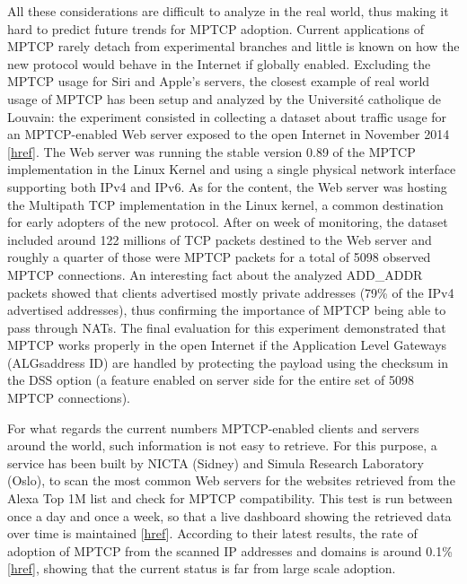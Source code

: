 All these considerations are difficult to analyze in the real world, thus making it hard to predict future trends for MPTCP adoption. Current applications of MPTCP rarely detach from experimental branches and little is known on how the new protocol would behave in the Internet if globally enabled. Excluding the MPTCP usage for Siri and Apple's servers, the closest example of real world usage of MPTCP has been setup and analyzed by the Université catholique de Louvain: the experiment consisted in collecting a dataset about traffic usage for an MPTCP-enabled Web server exposed to the open Internet in November 2014 [\href{http://inl.info.ucl.ac.be/system/files/paper_8.pdf}{href}]. The Web server was running the stable version 0.89 of the MPTCP implementation in the Linux Kernel and using a single physical network interface supporting both IPv4 and IPv6. As for the content, the Web server was hosting the Multipath TCP implementation in the Linux kernel, a common destination for early adopters of the new protocol. After on week of monitoring, the dataset included around 122 millions of TCP packets destined to the Web server and roughly a quarter of those were MPTCP packets for a total of 5098 observed MPTCP connections. 
An interesting fact about the analyzed ADD\_ADDR packets showed that clients advertised mostly private addresses (79\% of the IPv4 advertised addresses), thus confirming the importance of MPTCP being able to pass through NATs. 
The final evaluation for this experiment demonstrated that MPTCP works properly in the open Internet if the Application Level Gateways (ALGsaddress ID) are handled by protecting the payload using the checksum in the DSS option (a feature enabled on server side for the entire set of 5098 MPTCP connections).

For what regards the current numbers MPTCP-enabled clients and servers around the world, such information is not easy to retrieve. For this purpose, a service has been built by NICTA (Sidney) and Simula Research Laboratory (Oslo), to scan the most common Web servers for the websites retrieved from the Alexa Top 1M list and check for MPTCP compatibility. This test is run between once a day and once a week, so that a live dashboard showing the retrieved data over time is maintained [\href{https://academic-network-security.research.nicta.com.au/mptcp/deployment/}{href}]. According to their latest results, the rate of adoption of MPTCP from the scanned IP addresses and domains is around 0.1\% [\href{http://www.nicta.com.au/publications/research-publications/?pid=8791}{href}], showing that the current status is far from large scale adoption.